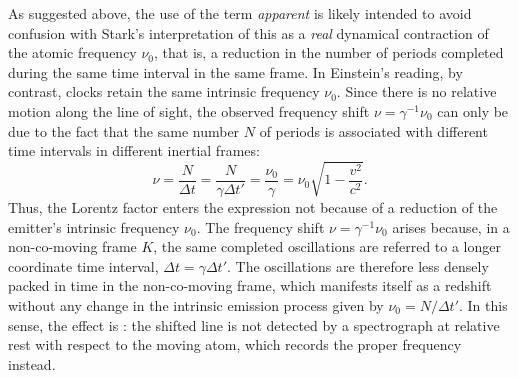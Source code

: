 \documentclass[pdflatex]{sn-jnl}
\newcommand{\igamma}{\ensuremath{\gamma^{-1}}\xspace}
\begin{document}
As suggested above, the use of the term \emph{apparent} is likely intended to avoid confusion with Stark’s interpretation of this  as a \emph{real} dynamical contraction of the atomic frequency $\nu_0$, that is, a reduction in the number of periods completed during the same time interval in the same frame. In Einstein’s reading, by contrast, clocks retain the same intrinsic frequency $\nu_0$. Since there is no relative motion along the line of sight, the observed frequency shift $\nu=\igamma \nu_0$ can only be due to the fact that the same number $N$ of periods is associated with different time intervals in different inertial frames:
%
\begin{equation*}
\nu = \frac{N}{\Delta t} = \frac{N}{\gamma \Delta t'} = \frac{\nu_0}{\gamma} = \nu_0 \sqrt{1-\frac{v^2}{c^2}}.
\end{equation*}
%
Thus, the Lorentz factor enters the expression not because of a  reduction of the emitter’s intrinsic frequency $\nu_0$. The frequency shift $\nu=\gamma^{-1}\nu_0$ arises because, in a non-co-moving frame $K$, the same completed oscillations are referred to a longer coordinate time interval, $\Delta t=\gamma \Delta t'$. The oscillations are therefore less densely packed in time in the non-co-moving frame, which manifests itself as a redshift without any change in the intrinsic emission process given by $\nu_0=N/\Delta t'$. In this sense, the effect is : the shifted line is not detected by a spectrograph at relative rest with respect to the moving atom, which records the proper frequency instead.
\end{document}
